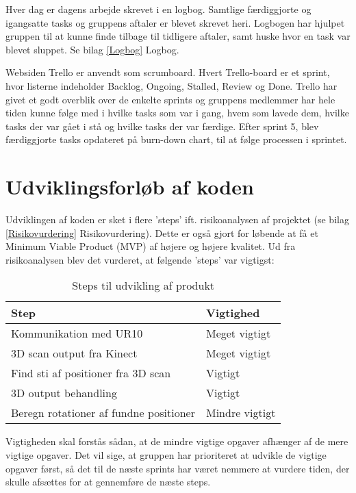 Hver dag er dagens arbejde skrevet i en logbog. Samtlige færdiggjorte og igangsatte tasks og gruppens aftaler er blevet skrevet heri. Logbogen har hjulpet gruppen til at kunne finde tilbage til tidligere aftaler, samt huske hvor en task var blevet sluppet. Se bilag \ref{Logbog} Logbog.  

Websiden Trello er anvendt som scrumboard. Hvert Trello-board er et sprint, hvor listerne indeholder Backlog, Ongoing, Stalled, Review og Done. Trello har givet et godt overblik over de enkelte sprints og gruppens medlemmer har hele tiden kunne følge med i hvilke tasks som var i gang, hvem som lavede dem, hvilke tasks der var gået i stå og hvilke tasks der var færdige. Efter sprint 5, blev færdiggjorte tasks opdateret på burn-down chart, til at følge processen i sprintet. 
\newpage
\section{Udviklingsforløb af koden}
Udviklingen af koden er sket i flere 'steps' ift. risikoanalysen af projektet (se bilag \ref{Risikovurdering} Risikovurdering). Dette er også gjort for løbende at få et Minimum Viable Product (MVP) af højere og højere kvalitet. 
Ud fra risikoanalysen blev det vurderet, at følgende 'steps' var vigtigst:

\begin{table}[h]
\centering
\begin{tabular}{|l| p{}|}
\hline
\textbf{Step} &  \textbf{Vigtighed} \\\hline
	Kommunikation med UR10 & Meget vigtigt \\\hline
	3D scan output fra Kinect & Meget vigtigt\\\hline
	Find sti af positioner fra 3D scan & Vigtigt \\\hline
	3D output behandling & Vigtigt \\\hline
	Beregn rotationer af fundne positioner & Mindre vigtigt \\\hline
\end{tabular}
\caption{Steps til udvikling af produkt}
\end{table}

Vigtigheden skal forstås sådan, at de mindre vigtige opgaver afhænger af de mere vigtige opgaver. 
Det vil sige, at gruppen har prioriteret at udvikle de vigtige opgaver først, så det til de næste sprints har været nemmere at vurdere tiden, der skulle afsættes for at gennemføre de næste steps.

